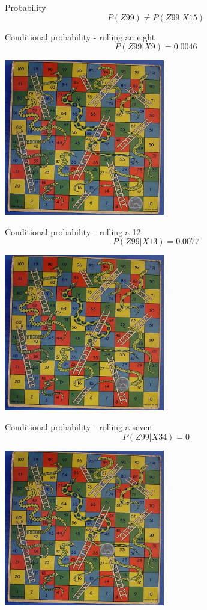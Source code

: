 \documentclass{beamer}
\newcommand{\crish}{\color{reddish}}
\newcommand{\cbla}{\color{black}}
\begin{document}
\begin{frame}{Probability}
  \crish $$ P(Z99)\not=P(Z99|X15) $$ \cbla
\end{frame}


\begin{frame}{Conditional probability - rolling an eight}
    \crish $$ P(Z99|X9)=0.0046 $$ \cbla
  \begin{center}
    \includegraphics[width=7cm]{game9.jpg}
  \end{center}
\end{frame}


\begin{frame}{Conditional probability - rolling a 12}
    \crish $$ P(Z99|X13)=0.0077 $$ \cbla
  \begin{center}
    \includegraphics[width=7cm]{game13.jpg}
  \end{center}
\end{frame}

\begin{frame}{Conditional probability - rolling a seven}
    \crish $$ P(Z99|X34)=0 $$ \cbla
  \begin{center}
    \includegraphics[width=7cm]{game34.jpg}
  \end{center}
\end{frame}
\end{document}
